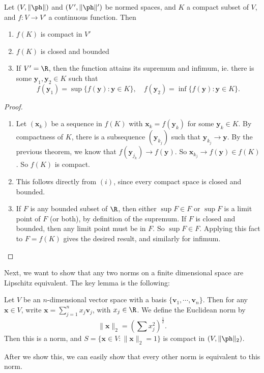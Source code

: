 \documentclass[a4paper]{article}
\begin{document}
\begin{thm}[]
  Let $(V, \|\ph\|)$ and $(V', \|\ph\|')$ be normed spaces, and $K$ a compact subset of $V$, and $f: V \to V'$ a continuous function. Then
  \begin{enumerate}
    \item $f(K)$ is compact in $V'$
    \item $f(K)$ is closed and bounded
    \item If $V' = \R$, then the function attains its supremum and infimum, ie. there is some $\mathbf{y}_1, \mathbf{y}_2 \in K$ such that
      \[
        f(\mathbf{y}_1) = \sup\{f(\mathbf{y}): \mathbf{y} \in K\},\quad f(\mathbf{y}_2) = \inf\{f(\mathbf{y}): \mathbf{y} \in K\}.
      \]
  \end{enumerate}
\end{thm}

\begin{proof}\leavevmode
  \begin{enumerate}
    \item Let $(\mathbf{x}_k)$ be a sequence in $f(K)$ with $\mathbf{x}_k = f(\mathbf{y}_k)$ for some $\mathbf{y}_k \in K$. By compactness of $K$, there is a subsequence $(\mathbf{y}_{k_j})$ such that $\mathbf{y}_{k_j} \to \mathbf{y}$. By the previous theorem, we know that $f(\mathbf{y}_{j_k}) \to f(\mathbf{y})$. So $\mathbf{x}_{k_j} \to f(\mathbf{y}) \in f(K)$. So $f(K)$ is compact.
    \item This follows directly from $(i)$, since every compact space is closed and bounded.
    \item If $F$ is any bounded subset of $\R$, then either $\sup F \in F$ or $\sup F$ is a limit point of $F$ (or both), by definition of the supremum. If $F$ is closed and bounded, then any limit point must be in $F$. So $\sup F \in F$. Applying this fact to $F = f(K)$ gives the desired result, and similarly for infimum.
  \end{enumerate}
\end{proof}

Next, we want to show that any two norms on a finite dimensional space are Lipschitz equivalent. The key lemma is the following:
\begin{lemma}
  Let $V$ be an $n$-dimensional vector space with a basis $\{\mathbf{v}_1, \cdots, \mathbf{v}_n\}$. Then for any $\mathbf{x} \in V$, write $\mathbf{x} = \sum_{j = 1}^n x_j \mathbf{v}_j$, with $x_j \in \R$. We define the Euclidean norm by
  \[
    \|\mathbf{x}\|_2 = \left(\sum x_j^2\right)^{\frac{1}{2}}.
  \]
  Then this is a norm, and $S = \{\mathbf{x} \in V: \|\mathbf{x}\|_2 = 1\}$ is compact in $(V, \|\ph\|_2)$.
\end{lemma}
After we show this, we can easily show that every other norm is equivalent to this norm.
\end{document}
